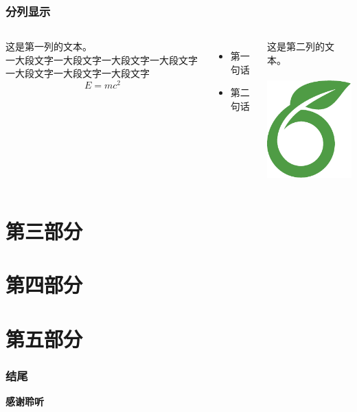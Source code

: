 \documentclass{beamer}
\begin{document}
\begin{frame}
\frametitle{分列显示}

\begin{columns}

这是第一列的文本。\\
一大段文字一大段文字一大段文字一大段文字一大段文字一大段文字一大段文字\\
$$E=mc^2$$
\begin{itemize}
\item 第一句话
\item 第二句话
\end{itemize}

\vspace*{\fill} %

这是第二列的文本。\\
\hspace*{\fill}\\ %
\includegraphics{overleaf-logo}

\end{columns}
\end{frame}

\section{第三部分}

\section{第四部分}

\section{第五部分}

\begin{frame}
\frametitle{结尾}
\huge{\textbf{感谢聆听}}
\centering
\end{frame}


\end{document}
